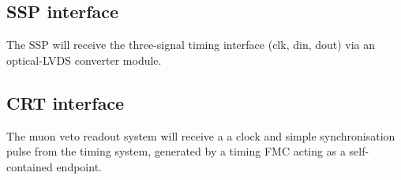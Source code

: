 \documentclass[a4paper,11pt]{article}
\begin{document}
\subsection{SSP interface}

The SSP will receive the three-signal timing interface (clk, din, dout) via an optical-LVDS converter module.

\subsection{CRT interface}

The muon veto readout system will receive a a clock and simple synchronisation pulse from the timing system, generated by a timing FMC acting as a self-contained endpoint.

\clearpage
\printbibliography
\end{document}
